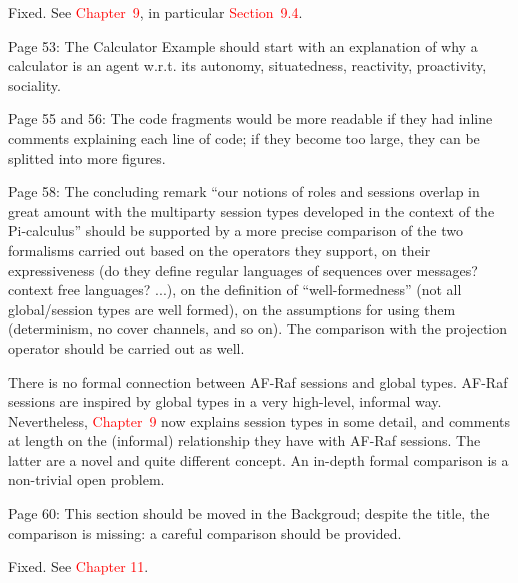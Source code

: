 \documentclass{article}
\newcommand*\R[1]{\textcolor{red}{#1}} %
\newcommand{\todo}[1]{[\textcolor{green}{TODO}: #1]}
\newenvironment{them}{\noindent\begingroup\color{blue}}{\endgroup\par}
\begin{document}
Fixed.
See \R{Chapter~9},
  in particular \R{Section~9.4}.

\begin{them}

Page 53:
The Calculator Example should start with an explanation of why a calculator is
an agent w.r.t. its autonomy, situatedness, reactivity, proactivity, sociality.

\end{them}
\todo{}

\begin{them}

Page 55 and 56:
The code fragments would be more readable if they had inline comments
explaining each line of code; if they become too large, they can be splitted
into more figures.

\end{them}
\todo{}

\begin{them}

Page 58:
The concluding remark ``our notions of roles and sessions overlap in great
amount with the multiparty session types developed in the context of the
Pi-calculus'' should be supported by a more precise comparison of the two
formalisms carried out based on the operators they support, on their
expressiveness (do they define regular languages of sequences over messages?
context free languages? ...), on the definition of ``well-formedness'' (not all
global/session types are well formed), on the assumptions for using them
(determinism, no cover channels, and so on). The comparison with the projection
operator should be carried out as well.

\end{them}

There is no formal connection between AF-Raf sessions and global types.
AF-Raf sessions are inspired by global types in a very high-level,
  informal way.
Nevertheless,
  \R{Chapter~9} now explains session types in some detail,
  and comments at length on the (informal) relationship they have with
    AF-Raf sessions.
The latter are a novel and quite different concept.
An in-depth formal comparison is a non-trivial open problem.


\begin{them}

Page 60:
This section should be moved in the Backgroud; despite the title, the
comparison is missing: a careful comparison should be provided.

\end{them}
Fixed. See \R{Chapter 11}.
\end{document}
